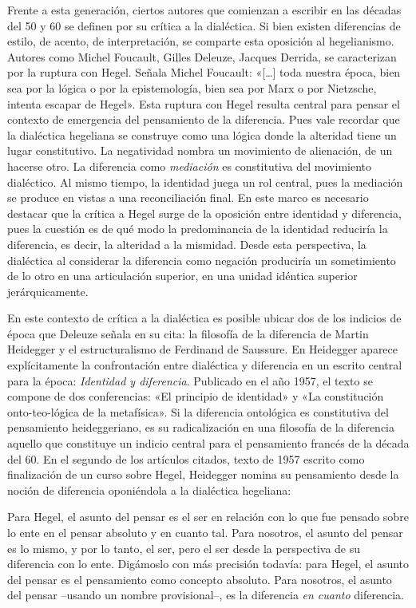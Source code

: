 Frente a esta generación, ciertos autores que comienzan a escribir en las décadas del 50 y 60 se definen por su crítica a la dialéctica. Si bien existen diferencias de estilo, de acento, de interpretación, se comparte esta oposición al hegelianismo. Autores como Michel Foucault, Gilles Deleuze, Jacques Derrida, se caracterizan por la ruptura con Hegel. Señala Michel Foucault: «{[}\ldots{]} toda nuestra época, bien sea por la lógica o por la epistemología, bien sea por Marx o por Nietzsche, intenta escapar de Hegel». Esta ruptura con Hegel resulta central para pensar el contexto de emergencia del pensamiento de la diferencia. Pues vale recordar que la dialéctica hegeliana se construye como una lógica donde la alteridad tiene un lugar constitutivo. La negatividad nombra un movimiento de alienación, de un hacerse otro. La diferencia como \emph{mediación} es constitutiva del movimiento dialéctico. Al mismo tiempo, la identidad juega un rol central, pues la mediación se produce en vistas a una reconciliación final. En este marco es necesario destacar que la crítica a Hegel surge de la oposición entre identidad y diferencia, pues la cuestión es de qué modo la predominancia de la identidad reduciría la diferencia, es decir, la alteridad a la mismidad. Desde esta perspectiva, la dialéctica al considerar la diferencia como negación produciría un sometimiento de lo otro en una articulación superior, en una unidad idéntica superior jerárquicamente.

En este contexto de crítica a la dialéctica es posible ubicar dos de los indicios de época que Deleuze señala en su cita: la filosofía de la diferencia de Martin Heidegger y el estructuralismo de Ferdinand de Saussure. En Heidegger aparece explícitamente la confrontación entre dialéctica y diferencia en un escrito central para la época: \emph{Identidad y diferencia}. Publicado en el año 1957, el texto se compone de dos conferencias: «El principio de identidad» y «La constitución onto-teo-lógica de la metafísica». Si la diferencia ontológica es constitutiva del pensamiento heideggeriano, es su radicalización en una filosofía de la diferencia aquello que constituye un indicio central para el pensamiento francés de la década del 60. En el segundo de los artículos citados, texto de 1957 escrito como finalización de un curso sobre Hegel, Heidegger nomina su pensamiento desde la noción de diferencia oponiéndola a la dialéctica hegeliana:

Para Hegel, el asunto del pensar es el ser en relación con lo que fue pensado sobre lo ente en el pensar absoluto y en cuanto tal. Para nosotros, el asunto del pensar es lo mismo, y por lo tanto, el ser, pero el ser desde la perspectiva de su diferencia con lo ente. Digámoslo con más precisión todavía: para Hegel, el asunto del pensar es el pensamiento como concepto absoluto. Para nosotros, el asunto del pensar --usando un nombre provisional--, es la diferencia \emph{en cuanto }diferencia.


